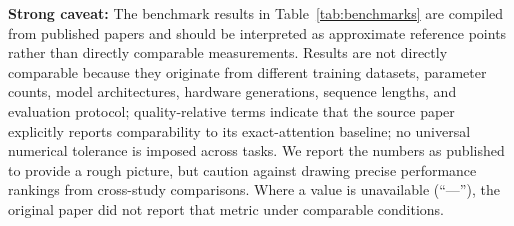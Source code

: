 \documentclass[10pt,twocolumn]{article}
\begin{document}
\textbf{Strong caveat:} The benchmark results in Table~\ref{tab:benchmarks} are compiled from published papers and should be interpreted as approximate reference points rather than directly comparable measurements. Results are not directly comparable because they originate from different training datasets, parameter counts, model architectures, hardware generations, sequence lengths, and evaluation protocol; quality-relative terms indicate that the source paper explicitly reports comparability to its exact-attention baseline; no universal numerical tolerance is imposed across tasks. We report the numbers as published to provide a rough picture, but caution against drawing precise performance rankings from cross-study comparisons. Where a value is unavailable (``---''), the original paper did not report that metric under comparable conditions.
\end{document}
